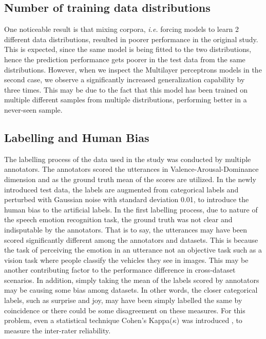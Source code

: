 \documentclass[a4paper,11pt]{article}
\begin{document}
\subsection{Number of training data distributions}
One noticeable result is that mixing corpora, \textit{i.e.} forcing models to learn 2 different data distributions, resulted in poorer performance in the original study. This is expected, since the same model is being fitted to the two distributions, hence the prediction performance gets poorer in the test data from the same distributions. However, when we inspect the Multilayer perceptrons models in the second case, we observe a significantly increased generalization capability by three times. This may be due to the fact that this model has been trained on multiple different samples from multiple distributions, performing better in a never-seen sample.   

\subsection{Labelling and Human Bias}

The labelling process of the data used in the study was conducted by multiple annotators. The annotators scored the utterances in Valence-Arousal-Dominance dimension and as the ground truth mean of the scores are utilized. In the newly introduced test data, the labels are augmented from categorical labels and perturbed with Gaussian noise with standard deviation 0.01, to introduce the human bias to the artificial labels. In the first labelling process, due to nature of the speech emotion recognition task, the ground truth was not clear and indisputable by the annotators. That is to say, the utterances may have been scored significantly different among the annotators and datasets. This is because the task of perceiving the emotion in an utterance not an objective task such as a vision task where people classify the vehicles they see in images. This may be another contributing factor to the performance difference in cross-dataset scenarios. In addition, simply taking the mean of the labels scored by annotators may be causing some bias among datasets. In other words, the closer categorical labels, such as surprise and joy, may have been simply labelled the same by coincidence or there could be some disagreement on these measures. For this problem, even a statistical technique Cohen's Kappa($\kappa$) was introduced \cite{cohenskappa}, to measure the inter-rater reliability.
\end{document}
